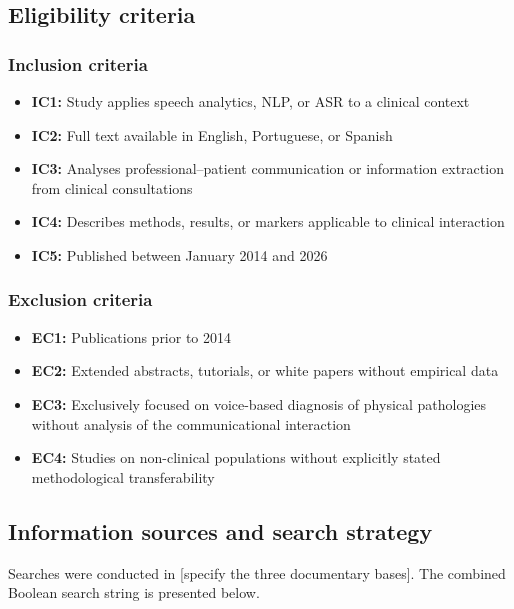 \documentclass[a4paper,fleqn]{cas-sc}
\begin{document}
\subsection{Eligibility criteria}

\subsubsection{Inclusion criteria}

\begin{itemize}
  \item \textbf{IC1:} Study applies speech analytics, NLP, or ASR to a
        clinical context
  \item \textbf{IC2:} Full text available in English, Portuguese, or Spanish
  \item \textbf{IC3:} Analyses professional–patient communication or
        information extraction from clinical consultations
  \item \textbf{IC4:} Describes methods, results, or markers applicable to
        clinical interaction
  \item \textbf{IC5:} Published between January 2014 and 2026
\end{itemize}

\subsubsection{Exclusion criteria}

\begin{itemize}
  \item \textbf{EC1:} Publications prior to 2014
  \item \textbf{EC2:} Extended abstracts, tutorials, or white papers without
        empirical data
  \item \textbf{EC3:} Exclusively focused on voice-based diagnosis of physical
        pathologies without analysis of the communicational interaction
  \item \textbf{EC4:} Studies on non-clinical populations without explicitly
        stated methodological transferability
\end{itemize}

\subsection{Information sources and search strategy}

Searches were conducted in [specify the three documentary bases]. The
combined Boolean search string is presented below.
\end{document}
